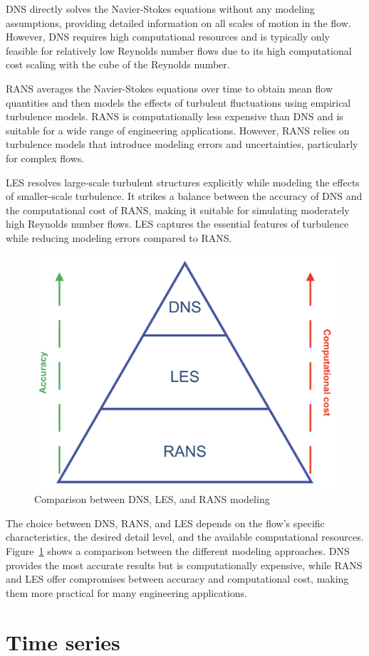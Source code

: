DNS directly solves the Navier-Stokes equations without any modeling assumptions, providing detailed information on all scales of motion in the flow. However, DNS requires high computational resources and is typically only feasible for relatively low Reynolds number flows due to its high computational cost scaling with the cube of the Reynolds number.

RANS averages the Navier-Stokes equations over time to obtain mean flow quantities and then models the effects of turbulent fluctuations using empirical turbulence models. RANS is computationally less expensive than DNS and is suitable for a wide range of engineering applications. However, RANS relies on turbulence models that introduce modeling errors and uncertainties, particularly for complex flows.

LES resolves large-scale turbulent structures explicitly while modeling the effects of smaller-scale turbulence. It strikes a balance between the accuracy of DNS and the computational cost of RANS, making it suitable for simulating moderately high Reynolds number flows. LES captures the essential features of turbulence while reducing modeling errors compared to RANS.

\begin{figure}[H]
    \centering
    \includegraphics[width=0.4\linewidth]{images/dns_les_rans.png}
    \caption{Comparison between DNS, LES, and RANS modeling}
    \label{fig:dns_les_rans}
\end{figure}

The choice between DNS, RANS, and LES depends on the flow's specific characteristics, the desired detail level, and the available computational resources. Figure~\ref{fig:dns_les_rans} shows a comparison between the different modeling approaches. DNS provides the most accurate results but is computationally expensive, while RANS and LES offer compromises between accuracy and computational cost, making them more practical for many engineering applications.

\section{Time series}
\label{sec:TimeSeries} 

